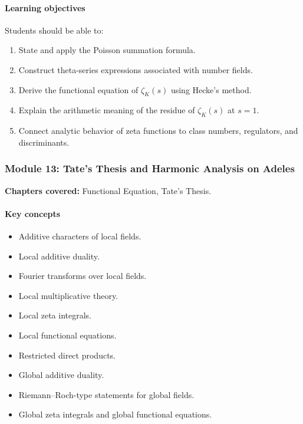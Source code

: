 \documentclass[11pt]{article}
\begin{document}
\paragraph{Learning objectives}
Students should be able to:
\begin{enumerate}
    \item State and apply the Poisson summation formula.
    \item Construct theta-series expressions associated with number fields.
    \item Derive the functional equation of $\zeta_K(s)$ using Hecke's method.
    \item Explain the arithmetic meaning of the residue of $\zeta_K(s)$ at $s=1$.
    \item Connect analytic behavior of zeta functions to class numbers, regulators, and discriminants.
\end{enumerate}

\subsubsection*{Module 13: Tate's Thesis and Harmonic Analysis on Adeles}

\textbf{Chapters covered:} Functional Equation, Tate's Thesis.

\paragraph{Key concepts}
\begin{itemize}
    \item Additive characters of local fields.
    \item Local additive duality.
    \item Fourier transforms over local fields.
    \item Local multiplicative theory.
    \item Local zeta integrals.
    \item Local functional equations.
    \item Restricted direct products.
    \item Global additive duality.
    \item Riemann--Roch-type statements for global fields.
    \item Global zeta integrals and global functional equations.
\end{itemize}
\end{document}
